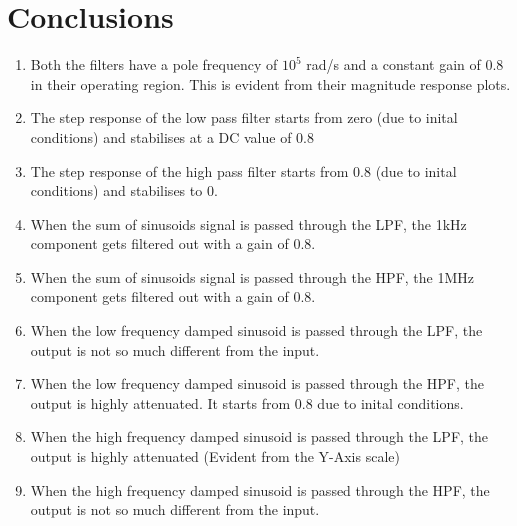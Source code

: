 \documentclass[12pt, a4paper]{article}
\begin{document}
\section{Conclusions}
\begin{enumerate}
    \item Both the filters have a pole frequency of $10^{5}$ rad/s and a constant gain of 0.8 in their operating region. This is evident from their magnitude response plots.
    \item The step response of the low pass filter starts from zero (due to inital conditions) and stabilises at a DC value of 0.8
    \item The step response of the high pass filter starts from 0.8 (due to inital conditions) and stabilises to 0.
    \item When the sum of sinusoids signal is passed through the LPF, the 1kHz component gets filtered out with a gain of 0.8.
    \item When the sum of sinusoids signal is passed through the HPF, the 1MHz component gets filtered out with a gain of 0.8.
    \item When the low frequency damped sinusoid is passed through the LPF, the output is not so much different from the input.
    \item When the low frequency damped sinusoid is passed through the HPF, the output is highly attenuated. It starts from 0.8 due to inital conditions.
    \item When the high frequency damped sinusoid is passed through the LPF, the output is highly attenuated (Evident from the Y-Axis scale)
    \item When the high frequency damped sinusoid is passed through the HPF, the output is not so much different from the input.
\end{enumerate}
\end{document}
